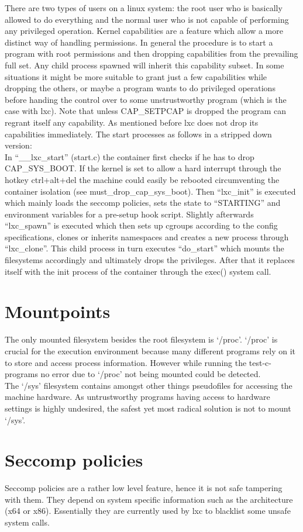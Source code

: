 There are two types of users on a linux system: the root user who is basically allowed to do everything and the normal user 
who is not capable of performing any privileged operation. Kernel capabilities are a feature which allow a more distinct way of handling
permissions. In general the procedure is to start a program with root permissions and then dropping capabilities from the prevailing full set.
Any child process spawned will inherit this capability subset.
In some situations it might be more suitable to grant just a few capabilities while dropping the others, or maybe a program wants to do
privileged operations before handing the control over to some unstrustworthy program (which is the case with lxc). Note
that unless CAP\_SETPCAP is dropped the program can regrant itself any capability\cite{kernelcaps}.
As mentioned before lxc does not drop its capabilities immediately. The start processes as follows in a stripped down version:\\
In ``\_\_lxc\_start'' (start.c) the container first checks if he has to drop CAP\_SYS\_BOOT. If the kernel is set to allow a hard interrupt through the
hotkey ctrl+alt+del the machine could easily be rebooted circumventing the container isolation (see must\_drop\_cap\_sys\_boot).
Then ``lxc\_init'' is executed which mainly loads the seccomp policies, sets the state to ``STARTING'' and environment variables for
a pre-setup hook script. Slightly afterwards ``lxc\_spawn'' is executed which then sets up cgroups according to the config specifications,
clones or inherits namespaces and creates a new process through ``lxc\_clone''. This child process in turn executes ``do\_start'' which
mounts the filesystems accordingly and ultimately drops the privileges. After that it replaces itself with the init process of
the container through the exec() system call.

\section{Mountpoints}

The only mounted filesystem besides the root filesystem is `/proc'. `/proc' is crucial for the execution environment because many
different programs rely on it to store and access process information. However while running the test-c-programs no error due
to `/proc' not being mounted could be detected.\\
The `/sys' filesystem contains amongst other things pseudofiles for accessing the machine hardware. As untrustworthy programs
having access to hardware settings is highly undesired, the safest yet most radical solution is not to mount `/sys'.

\section{Seccomp policies}

Seccomp policies are a rather low level feature, hence it is not safe tampering with them. They depend on system specific information such
as the architecture (x64 or x86). Essentially they are currently used by lxc to blacklist some unsafe system calls.